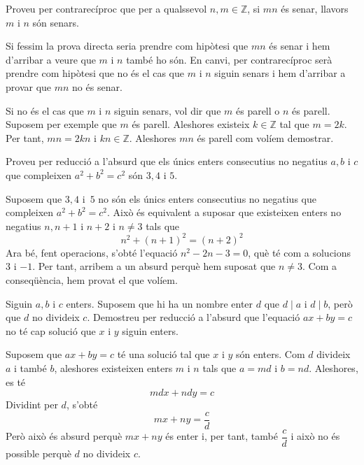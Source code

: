 \begin{exercici}
Proveu per contrarecíproc que per a qualssevol $n,m\in\mathbb{Z}$, si
$mn$ és senar, llavors $m$ i $n$ són senars.
\end{exercici}

\begin{solucio}
Si fessim la prova directa seria prendre com hipòtesi que $mn$ és
senar i hem d'arribar a veure que $m$ i $n$ també ho són. En canvi,
per contrarecíproc serà prendre com hipòtesi que no és el cas
que $m$ i $n$ siguin senars i hem d'arribar a provar que $mn$ no és senar.

Si no és el cas que $m$ i $n$ siguin senars, vol dir que $m$ és parell
o $n$ és parell. Suposem per exemple que $m$ és parell. Aleshores
existeix $k\in\mathbb{Z}$ tal que $m=2k$. Per tant, $mn=2kn$ i $kn\in
\mathbb{Z}$. Aleshores $mn$ és parell com volíem demostrar.
\end{solucio}

\begin{exercici}
Proveu per reducció a l'absurd que els únics enters consecutius no
negatius $a,b$ i $c$ que compleixen $a^{2}+b^{2}=c^{2}$ són $3,4$ i $5$.
\end{exercici}

\begin{solucio}
Suposem que $3,4$ i~$5$ no són els únics enters consecutius no
negatius que compleixen $a^{2}+b^{2}=c^{2}$. Això és equivalent a
suposar que existeixen enters no negatius $n,n+1$ i $n+2$ i $n\neq3$ tals que%
\[
n^{2}+(n+1)^{2}=(n+2)^{2}%
\]
Ara bé, fent operacions, s'obté l'equació $n^{2}-2n-3=0$, què
té com a solucions $3$ i $-1$. Per tant, arribem a un absurd perquè
hem suposat que $n\neq3$. Com a conseqüència, hem provat el que volíem.
\end{solucio}

\begin{exercici}
Siguin $a,b$ i $c$ enters. Suposem que hi ha un nombre enter $d$ que $d\mid a
$ i $d\mid b$, però que $d$ no divideix $c$. Demostreu per reducció a
l'absurd que l'equació $ax+by=c$ no té cap solució que $x$ i $y $
siguin enters.
\end{exercici}

\begin{solucio}
Suposem que $ax+by=c$ té una solució tal que $x$ i $y$ són enters.
Com $d$ divideix $a$ i també $b$, aleshores existeixen enters $m$ i $n$
tals que $a=md$ i $b=nd$. Aleshores, es té%
\[
mdx+ndy=c
\]
Dividint per $d$, s'obté%
\[
mx+ny=\frac{c}{d}%
\]
Però això és absurd perquè $mx+ny$ és enter i, per tant,
també $\dfrac{c}{d}$ i això no és possible perquè $d$ no
divideix $c$.
\end{solucio}

